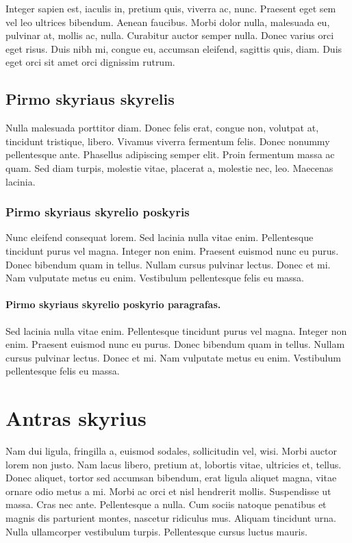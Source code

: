 \documentclass[a4paper, 12pt]{article}
\begin{document}
Integer sapien est, iaculis in, pretium quis, viverra ac, nunc. Praesent eget 
sem vel leo ultrices bibendum. Aenean faucibus. Morbi dolor nulla, malesuada 
eu, pulvinar at, mollis ac, nulla. Curabitur auctor semper nulla. Donec 
varius orci eget risus. Duis nibh mi, congue eu, accumsan eleifend, sagittis 
quis, diam. Duis eget orci sit amet orci dignissim rutrum.
%
\subsection{Pirmo skyriaus skyrelis}
%
Nulla malesuada porttitor diam. Donec felis erat, congue non, volutpat at, 
tincidunt tristique, libero. Vivamus viverra fermentum felis. Donec nonummy 
pellentesque ante. Phasellus adipiscing semper elit. Proin fermentum massa ac 
quam. Sed diam turpis, molestie vitae, placerat a, molestie nec, leo. 
Maecenas lacinia. 
%
\subsubsection{Pirmo skyriaus skyrelio poskyris}
%
Nunc eleifend consequat lorem. Sed lacinia nulla vitae enim. Pellentesque 
tincidunt purus vel magna. Integer non enim. Praesent euismod nunc eu purus. 
Donec bibendum quam in tellus. Nullam cursus pulvinar lectus. Donec et mi. 
Nam vulputate metus eu enim. Vestibulum pellentesque felis eu massa.
%
\paragraph{Pirmo skyriaus skyrelio poskyrio paragrafas.} 
%
Sed lacinia nulla vitae enim. Pellentesque tincidunt purus vel magna. Integer 
non enim. Praesent euismod nunc eu purus. Donec bibendum quam in tellus. 
Nullam cursus pulvinar lectus. Donec et mi. Nam vulputate metus eu enim. 
Vestibulum pellentesque felis eu massa.
%
%
\section{Antras skyrius}
%
Nam dui ligula, fringilla a, euismod sodales, sollicitudin vel, wisi. Morbi 
auctor lorem non justo. Nam lacus libero, pretium at, lobortis vitae, 
ultricies et, tellus. Donec aliquet, tortor sed accumsan bibendum, erat 
ligula aliquet magna, vitae ornare odio metus a mi. Morbi ac orci et nisl 
hendrerit mollis. Suspendisse ut massa. Cras nec ante. Pellentesque a nulla. 
Cum sociis natoque penatibus et magnis dis parturient montes, nascetur 
ridiculus mus. Aliquam tincidunt urna. Nulla ullamcorper vestibulum turpis. 
Pellentesque cursus luctus mauris.
%
\end{document}
